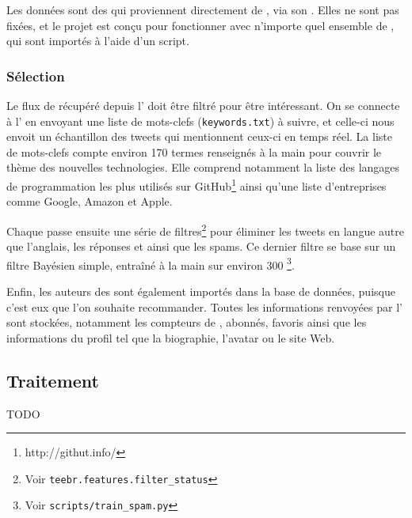 Les données sont des \tweets{} qui proviennent directement de \twt{}, via son
\api{}. Elles ne sont pas fixées, et le projet est conçu pour fonctionner avec
n’importe quel ensemble de \tweets{}, qui sont importés à l’aide d’un script.

\subsubsection{Sélection}

Le flux de \tweets{} récupéré depuis l’\api{} \twt{} doit être filtré pour être
intéressant. On se connecte à l’\api{} en envoyant une liste de mots-clefs
(\verb|keywords.txt|) à suivre, et celle-ci nous envoit un échantillon des
tweets qui mentionnent ceux-ci en temps réel. La liste de mots-clefs compte
environ 170 termes renseignés à la main pour couvrir le thème des nouvelles
technologies. Elle comprend notamment la liste des langages de programmation
les plus utilisés sur GitHub\footnote{http://githut.info/} ainsi qu’une liste
d’entreprises comme Google, Amazon et Apple.

Chaque \tweet{} passe ensuite une série de filtres\footnote{Voir
\verb|teebr.features.filter_status|} pour éliminer les tweets en langue autre
que l’anglais, les réponses et \rts{} ainsi que les spams. Ce dernier filtre se
base sur un filtre Bayésien simple, entraîné à la main sur environ 300
\tweets{}\footnote{Voir \verb|scripts/train_spam.py|}.

Enfin, les auteurs des \tweets{} sont également importés dans la base de
données, puisque c’est eux que l’on souhaite recommander. Toutes les
informations renvoyées par l’\api{} sont stockées, notamment les compteurs de
\tweets{}, abonnés, favoris ainsi que les informations du profil tel que la
biographie, l’avatar ou le site Web.

\subsection{Traitement}

TODO
